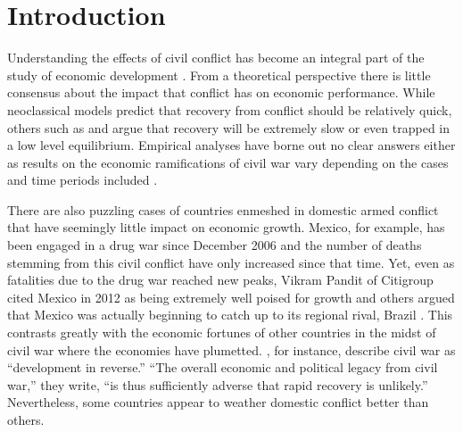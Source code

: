 \section{Introduction}
\label{intro}

Understanding the effects of civil conflict has become an integral part of the study of economic development \citep{serneels:verpoorten:2013}. From a theoretical perspective there is little consensus about the impact that conflict has on economic performance. While neoclassical models predict that recovery from conflict should be relatively quick, others such as \citet{barro:martin:2004} and \citet{sachs:2006} argue that recovery will be extremely slow or even trapped in a low level equilibrium. Empirical analyses have borne out no clear answers either as results on the economic ramifications of civil war vary depending on the cases and time periods included \citep{kang:meernik:2005}. 

There are also puzzling cases of countries enmeshed in domestic armed conflict that have seemingly little impact on economic growth. Mexico, for example, has been engaged in a drug war since December 2006 and the number of deaths stemming from this civil conflict have only increased since that time. Yet, even as fatalities due to the drug war reached new peaks, Vikram Pandit of Citigroup cited Mexico in 2012 as being extremely well poised for growth and others argued that Mexico was actually beginning to catch up to its regional rival, Brazil \citep{vardi:2012}. This contrasts greatly with the economic fortunes of other countries in the midst of civil war where the economies have plumetted. \cite{collier:elliott:etal:2003}, for instance, describe civil war as ``development in reverse.''  ``The overall economic and political legacy from civil war,'' they write, ``is thus sufficiently adverse that rapid recovery is unlikely.''  Nevertheless, some countries appear to weather domestic conflict better than others.  




